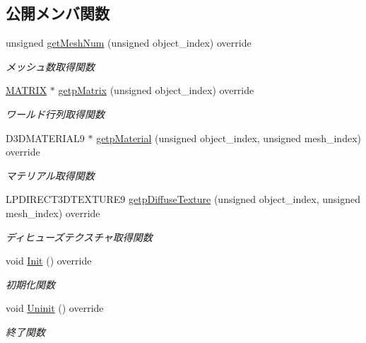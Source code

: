 \subsection*{公開メンバ関数}
\begin{DoxyCompactItemize}
\item 
unsigned \mbox{\hyperlink{class_push_space_logo_draw_abaa66b6e3c46aa03bae21bad271eebc0}{get\+Mesh\+Num}} (unsigned object\+\_\+index) override
\begin{DoxyCompactList}\small\item\em メッシュ数取得関数 \end{DoxyCompactList}\item 
\mbox{\hyperlink{_matrix_8h_a032295cd9fb1b711757c90667278e744}{M\+A\+T\+R\+IX}} $\ast$ \mbox{\hyperlink{class_push_space_logo_draw_a9e0875967651293ef97713477334bc2e}{getp\+Matrix}} (unsigned object\+\_\+index) override
\begin{DoxyCompactList}\small\item\em ワールド行列取得関数 \end{DoxyCompactList}\item 
D3\+D\+M\+A\+T\+E\+R\+I\+A\+L9 $\ast$ \mbox{\hyperlink{class_push_space_logo_draw_a4dc41e6b1afece431f3c321145abe541}{getp\+Material}} (unsigned object\+\_\+index, unsigned mesh\+\_\+index) override
\begin{DoxyCompactList}\small\item\em マテリアル取得関数 \end{DoxyCompactList}\item 
L\+P\+D\+I\+R\+E\+C\+T3\+D\+T\+E\+X\+T\+U\+R\+E9 \mbox{\hyperlink{class_push_space_logo_draw_a0b4de9ad688997090ab6ab4925e1f5d8}{getp\+Diffuse\+Texture}} (unsigned object\+\_\+index, unsigned mesh\+\_\+index) override
\begin{DoxyCompactList}\small\item\em ディヒューズテクスチャ取得関数 \end{DoxyCompactList}\item 
void \mbox{\hyperlink{class_push_space_logo_draw_a7ad3fe53d9bda4ea16c958bc102ff54e}{Init}} () override
\begin{DoxyCompactList}\small\item\em 初期化関数 \end{DoxyCompactList}\item 
void \mbox{\hyperlink{class_push_space_logo_draw_a79021c1df43968d6008de74126d53fba}{Uninit}} () override
\begin{DoxyCompactList}\small\item\em 終了関数 \end{DoxyCompactList}\item 

\end{DoxyCompactItemize}
